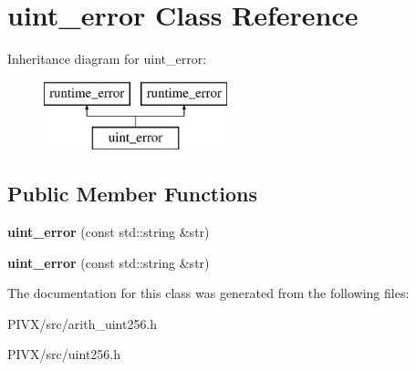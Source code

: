 \hypertarget{classuint__error}{}\section{uint\+\_\+error Class Reference}
\label{classuint__error}
Inheritance diagram for uint\+\_\+error\+:\begin{figure}[H]
\begin{center}
\leavevmode
\includegraphics[height=2.000000cm]{classuint__error}
\end{center}
\end{figure}
\subsection*{Public Member Functions}
\begin{DoxyCompactItemize}
\item 
\mbox{\label{classuint__error_a3d37e73d7d585ede158ebba7d32352c3}} 
{\bfseries uint\+\_\+error} (const std\+::string \&str)
\item 
\mbox{\label{classuint__error_a3d37e73d7d585ede158ebba7d32352c3}} 
{\bfseries uint\+\_\+error} (const std\+::string \&str)
\end{DoxyCompactItemize}


The documentation for this class was generated from the following files\+:\begin{DoxyCompactItemize}
\item 
P\+I\+V\+X/src/arith\+\_\+uint256.\+h\item 
P\+I\+V\+X/src/uint256.\+h\end{DoxyCompactItemize}
